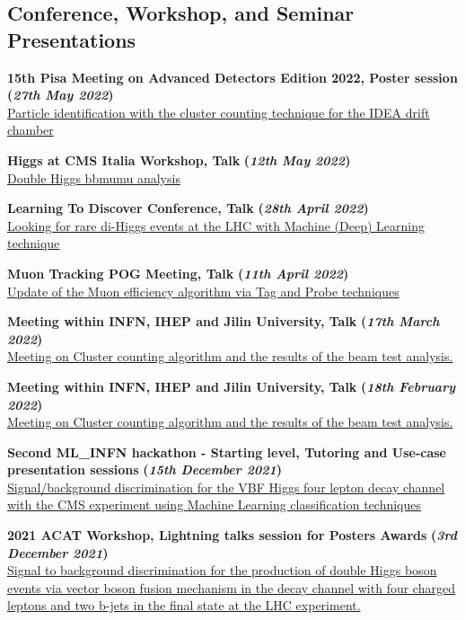 \documentclass[11pt]{res}
\newcommand{\MarginText}[1]{\section{#1}\vspace{10pt}}
\begin{document}
\begin{resume}
\MarginText{Conference, Workshop, and Seminar Presentations}

\textbf{15th Pisa Meeting on Advanced Detectors Edition 2022, Poster session} \textbf{(\textit{27th May 2022})}\\ 
\href{https://agenda.infn.it/event/22092/contributions/166630/}{Particle identification with the cluster counting technique for the IDEA drift chamber}

\textbf{Higgs at CMS Italia Workshop, Talk} \textbf{(\textit{12th May 2022})}\\ 
\href{https://indico.cern.ch/event/1137095/}{Double Higgs bbmumu analysis}

\textbf{Learning To Discover Conference, Talk} \textbf{(\textit{28th April 2022})}\\ 
\href{https://indico.ijclab.in2p3.fr/event/5999/contributions/25075/}{Looking for rare di-Higgs events at the LHC with Machine (Deep) Learning technique}

\textbf{Muon Tracking POG Meeting, Talk} \textbf{(\textit{11th April 2022})}\\ 
\href{https://indico.cern.ch/event/1148914/?note=193823}{Update of the Muon efficiency algorithm via Tag and Probe techniques}

\textbf{Meeting within INFN, IHEP and Jilin University, Talk} \textbf{(\textit{17th March 2022})} \\
\href{https://indico.ihep.ac.cn/event/15780/other-view?view=standard}{Meeting on Cluster counting algorithm and the results of the beam test analysis.}
			
\textbf{Meeting within INFN, IHEP and Jilin University, Talk} \textbf{(\textit{18th February 2022})} \\
\href{https://indico.ihep.ac.cn/event/15780/other-view?view=standard}{Meeting on Cluster counting algorithm and the results of the beam test analysis.}
											
\textbf{Second ML\_INFN hackathon - Starting level, Tutoring and Use-case presentation sessions} \textbf{(\textit{15th December 2021})}\\ 
\href{https://agenda.infn.it/event/28565/contributions/148551/}{Signal/background discrimination for the VBF Higgs four lepton decay channel with the CMS experiment using Machine Learning classification techniques}

\textbf{2021 ACAT Workshop, Lightning talks session for Posters Awards} \textbf{(\textit{3rd December 2021})}\\ 
\href{https://indico.cern.ch/event/855454/contributions/4596351/}{Signal to background discrimination for the production of double Higgs boson events via vector boson fusion mechanism in the decay channel with four charged leptons and two b-jets in the final state at the LHC experiment.}


\end{resume}
\end{document}
